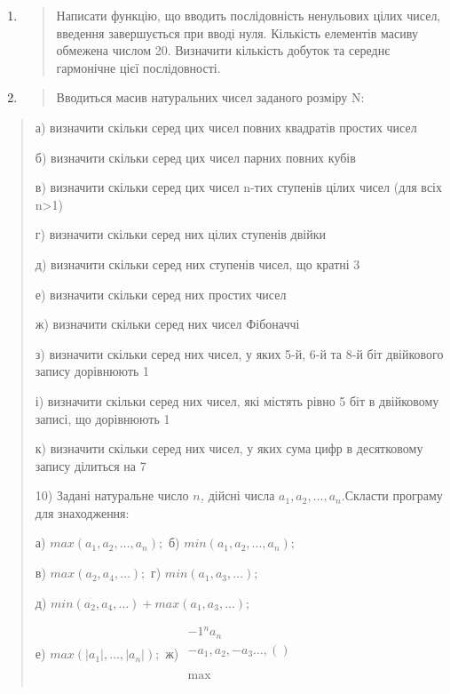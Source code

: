 \documentclass[]{article}
\begin{document}
\begin{enumerate}
\def\labelenumi{\arabic{enumi})}
\item
  \begin{quote}
  Написати функцію, що вводить послідовність ненульових цілих чисел,
  введення завершується при вводі нуля. Кількість елементів масиву
  обмежена числом 20. Визначити кількість добуток та середнє гармонічне
  цієї послідовності.
  \end{quote}
\item
  \begin{quote}
  Вводиться масив натуральних чисел заданого розміру N:
  \end{quote}
\end{enumerate}

\begin{quote}
а) визначити скільки серед цих чисел повних квадратів простих чисел

б) визначити скільки серед цих чисел парних повних кубів

в) визначити скільки серед цих чисел n-тих ступенів цілих чисел (для
всіх n\textgreater{}1)

г) визначити скільки серед них цілих ступенів двійки

д) визначити скільки серед них ступенів чисел, що кратні 3

е) визначити скільки серед них простих чисел

ж) визначити скільки серед них чисел Фібоначчі

з) визначити скільки серед них чисел, у яких 5-й, 6-й та 8-й біт
двійкового запису дорівнюють 1

і) визначити скільки серед них чисел, які містять рівно 5 біт в
двійковому записі, що дорівнюють 1

к) визначити скільки серед них чисел, у яких сума цифр в десятковому
запису ділиться на 7

10) Задані натуральне число \(n\)\emph{,} дійсні числа
\(a_{1},a_{2},\ldots,a_{n}.\)Скласти програму для знаходження:

а) \(max(a_{1},a_{2},\ldots,a_{n});\) б)
\(min(a_{1},a_{2},\ldots,a_{n});\)

в) \(max(a_{2},a_{4},\ldots);\) г) \(min(a_{1},a_{3},\ldots);\)

д) \(min(a_{2},a_{4},\ldots) + max(a_{1},a_{3},\ldots);\)

е) \(max(|a_{1}|,\ldots,|a_{n}|);\) ж) \(\begin{matrix}
 - 1{}^{n}a_{n} \\
 - a_{1},a_{2}, - a_{3}\ldots,() \\
 \\
 \\
\max \\
\end{matrix}\)


\end{quote}
\end{document}
